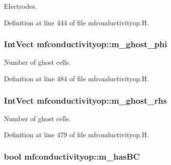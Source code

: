 Electrodes. 



Definition at line 444 of file mfconductivityop.\+H.

\subsubsection[{\texorpdfstring{m\+\_\+ghost\+\_\+phi}{m_ghost_phi}}]{\setlength{\rightskip}{0pt plus 5cm}Int\+Vect mfconductivityop\+::m\+\_\+ghost\+\_\+phi\hspace{0.3cm}{\ttfamily [protected]}}\hypertarget{classmfconductivityop_ac9123b56a508d85fe8e71bd4cd951d5a}{}\label{classmfconductivityop_ac9123b56a508d85fe8e71bd4cd951d5a}


Number of ghost cells. 



Definition at line 484 of file mfconductivityop.\+H.

\subsubsection[{\texorpdfstring{m\+\_\+ghost\+\_\+rhs}{m_ghost_rhs}}]{\setlength{\rightskip}{0pt plus 5cm}Int\+Vect mfconductivityop\+::m\+\_\+ghost\+\_\+rhs\hspace{0.3cm}{\ttfamily [protected]}}\hypertarget{classmfconductivityop_a06b47567363fd09422626e794455f179}{}\label{classmfconductivityop_a06b47567363fd09422626e794455f179}


Number of ghost cells. 



Definition at line 479 of file mfconductivityop.\+H.

\subsubsection[{\texorpdfstring{m\+\_\+has\+BC}{m_hasBC}}]{\setlength{\rightskip}{0pt plus 5cm}bool mfconductivityop\+::m\+\_\+has\+BC\hspace{0.3cm}{\ttfamily [protected]}}\hypertarget{classmfconductivityop_acd95e18d574d720f5be8b662e8c44381}{}\label{classmfconductivityop_acd95e18d574d720f5be8b662e8c44381}


